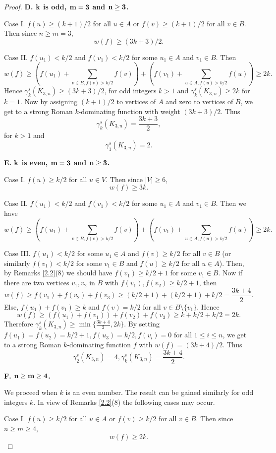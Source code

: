 \documentclass[12pt]{amsart}
\begin{document}
\begin{proof}
\textbf{D. ${\bf k}$ is odd, ${\bf m=3}$ and ${\bf n\geq 3}$.} 

Case I.  $f(u)\geq (k+1)/2$ for all $u\in A$ or $f(v)\geq (k+1)/2$ for all $v\in B$. Then since $n\geq m=3$, 
$$w(f)\geq (3k+3)/2.$$

Case II.  $f(u_1)<k/2$ and $f(v_1)< k/2$ for some $u_1\in A$ and $v_1\in B$. Then 
$$w(f)\geq (f(u_1)+\sum_{v\in B,f(v)>k/2}f(v))+(f(v_1)+\sum _{u\in A, f(u)>k/2}f(u))\geq 2k.$$
Hence $\gamma_k^s(K_{3,n})\geq (3k+3)/2$, for odd integers $k>1$ and $\gamma_k^s(K_{3,n})\geq 2k$ for $k=1$. Now by assigning $(k+1)/2$ to vertices of $A$ and zero to vertices of $B$, we get to a strong Roman $k$-dominating function with weight $(3k+3)/2$. Thus
$$\gamma_k^s(K_{3,n})=\frac{3k+3}{2},$$
for $k>1$ and 
$$\gamma_1^s(K_{3,n})=2.$$

\textbf{E. ${\bf k}$ is even, ${\bf m=3}$ and ${\bf n\geq 3}$.}

Case I.  $f(u)\geq k/2$ for all $u\in V$. Then since $|V|\geq 6$, 
$$w(f)\geq 3k.$$

Case II. $f(u_1)<k/2$ and $f(v_1)<k/2$ for some $u_1\in A$ and $v_1\in B$. Then we have
$$w(f)\geq (f(u_1)+\sum_{v\in B, f(v)>k/2}f(v))+(f(v_1)+\sum_{u\in A,f(u)>k/2}f(u))\geq 2k.$$

Case III. $f(u_1)<k/2$ for some $u_1\in A$ and $f(v)\geq k/2$ for all $v\in B$ (or similarly $f(v_1)<k/2$ for some $v_1\in B$ and $f(u)\geq k/2$ for all $u\in A$). Then, by Remarks \ref{2.2}(8) we should have $f(v_1)\geq k/2+1$ for some $v_1\in B$. Now if there are two vertices $v_1, v_2$ in $B$ with $f(v_1), f(v_2)\geq k/2+1$, then 
$$w(f)\geq f(v_1)+f(v_2)+f(v_3)\geq (k/2+1)+(k/2+1)+k/2=\frac{3k+4}{2}.$$
Else, $f(u_1)+f(v_1)\geq k$ and $f(v)=k/2$ for all $v\in B\setminus \{v_1\}$. Hence
$$w(f)\geq (f(u_1)+f(v_1))+f(v_2)+f(v_3)\geq k+k/2+k/2=2k.$$
Therefore $\gamma_k^s(K_{3,n})\geq \min \{\frac{3k+4}{2}, 2k\}$. By setting $f(u_1)=f(u_2)=k/2+1, f(u_3)=k/2, f(v_i)=0$ for all $1\leq i \leq n$, we get to a strong Roman $k$-dominating function $f$ with $w(f)=(3k+4)/2$. Thus
$$\gamma_2^s(K_{3,n})=4, \gamma_k^s(K_{3,n})=\frac{3k+4}{2}.$$


\textbf{F. ${\bf n\geq m\geq 4}$.}

We proceed when $k$ is an even number. The result can be gained similarly for odd integers $k$. In view of Remarks \ref{2.2}(8) the following cases may occur.

Case I.  $f(u)\geq k/2$ for all $u\in A$ or $f(v)\geq k/2$ for all $v\in B$. Then since $n\geq m\geq 4$, 
$$w(f)\geq 2k.$$


\end{proof}
\end{document}
